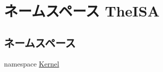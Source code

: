 \hypertarget{namespaceTheISA}{
\section{ネームスペース TheISA}
\label{namespaceTheISA}
}
\subsection*{ネームスペース}
\begin{DoxyCompactItemize}
\item 
namespace \hyperlink{namespaceTheISA_1_1Kernel}{Kernel}
\end{DoxyCompactItemize}
